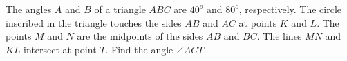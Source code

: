 The angles $A$ and $B$ of a triangle $ABC$ are $40^o$ and $80^o$, respectively. The circle inscribed in the triangle touches the sides $AB$ and $AC$ at points $K$ and $L$. The points $M$ and $N$ are the midpoints of the sides $AB$ and $BC$. The lines $MN$ and $KL$ intersect at point $T$. Find the angle $\angle ACT$.
